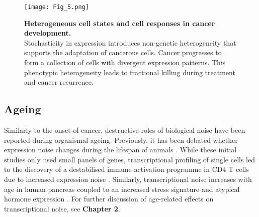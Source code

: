 
\begin{figure}[!h]
\centering
\texttt{[image: Fig\_5.png]}
\caption[Heterogeneous cell states and cell responses in cancer development]{\textbf{Heterogeneous cell states and cell responses in cancer development.}\\
Stochasticity in expression introduces non-genetic heterogeneity that supports the adaptation of cancerous cells. 
Cancer progresses to form a collection of cells with divergent expression patterns. 
This phenotypic heterogeneity leads to fractional killing during treatment and cancer recurrence.}
\label{fig0:cancer}
\end{figure}

\newpage

\subsection{Ageing}

Similarly to the onset of cancer, destructive roles of biological noise have been reported during organismal ageing. 
Previously, it has been debated whether expression noise changes during the lifespan of animals \cite{Bahar2006, Warren2007}. 
While these initial studies only used small panels of genes, transcriptional profiling of single cells led to the discovery of a destabilised immune activation programme in CD4\plus{} T cells due to increased expression noise \cite{Martinez-jimenez2017}. 
Similarly, transcriptional noise increases with age in human pancreas coupled to an increased stress signature and atypical hormone expression \citep{Enge2017}. 
For further discussion of age-related effects on transcriptional noise, see \textbf{Chapter 2}. \\


